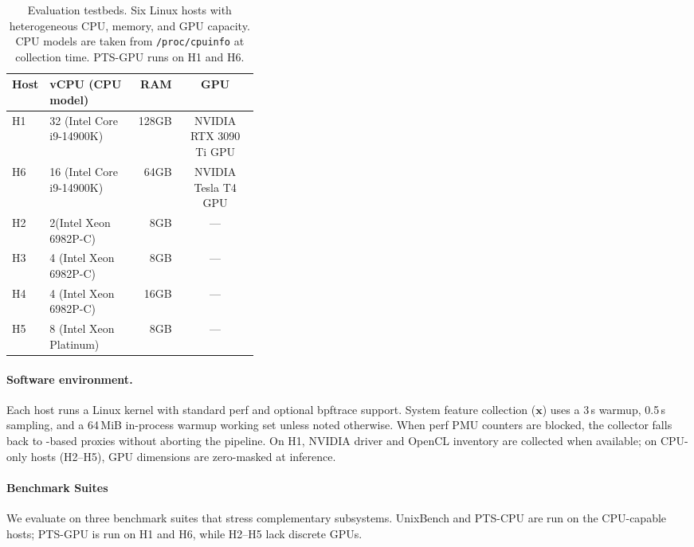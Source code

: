 \documentclass[sigplan,10pt]{acmart}
\newcommand{\ptscpu}{PTS-CPU}
\newcommand{\ptsgpu}{PTS-GPU}
\begin{document}
\begin{table}[t]
\centering
\caption{Evaluation testbeds. Six Linux hosts with heterogeneous CPU, memory, and GPU capacity. CPU models are taken from \texttt{/proc/cpuinfo} at collection time. \ptsgpu{} runs on H1 and H6.}
\label{tab:testbeds}
\small
\setlength{\tabcolsep}{2pt}
\begin{tabular}{@{}lp{0.36\linewidth}rc@{}}
\toprule
\textbf{Host} & \textbf{vCPU (CPU model)} & \textbf{RAM} & \textbf{GPU} \\
\midrule
H1 & 32 (Intel Core i9-14900K) & 128GB & NVIDIA RTX 3090 Ti GPU \\
H6 & 16 (Intel Core i9-14900K) & 64GB & NVIDIA Tesla T4 GPU \\
H2 & 2(Intel Xeon 6982P-C) & 8GB & --- \\
H3 & 4 (Intel Xeon 6982P-C) & 8GB & --- \\
H4 & 4 (Intel Xeon 6982P-C) & 16GB & --- \\
H5 & 8 (Intel Xeon Platinum) & 8GB & --- \\
\bottomrule
\end{tabular}
\end{table}


\paragraph{Software environment.}
Each host runs a Linux kernel with standard perf and optional bpftrace support.
System feature collection (\(\mathbf{x}\)) uses a 3\,s warmup, 0.5\,s  sampling, and a 64\,MiB in-process warmup working set unless noted otherwise.
When perf PMU counters are blocked, the collector falls back to -based proxies without aborting the pipeline.
On H1, NVIDIA driver and OpenCL inventory are collected when available; on CPU-only hosts (H2--H5), GPU dimensions are zero-masked at inference.



\paragraph{Benchmark Suites}
\label{subsubsec:benchmark-suites}

We evaluate on three benchmark suites that stress complementary subsystems.
UnixBench and \ptscpu{} are run on the CPU-capable hosts; \ptsgpu{} is run on H1 and H6, while H2--H5 lack discrete GPUs.
\end{document}

